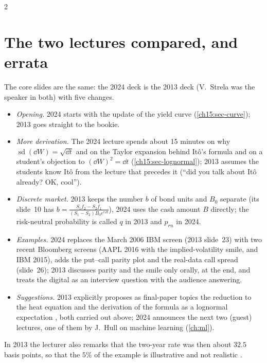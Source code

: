 \begin{paracol}{2}
\section{The two lectures compared, and errata}\label{ch15:sec-compare}
\begin{coursenote}[2013 versus 2024]
The core slides are the same: the 2024 deck is the 2013 deck (V.~Strela was the speaker in both) with five changes.
\begin{itemize}[nosep]
  \item \emph{Opening.} 2024 starts with the update of the yield curve (\cref{ch15:sec-curve}); 2013 goes straight to the bookie.
  \item \emph{More derivation.} The 2024 lecture spends about 15 minutes on why $\operatorname{sd}(\dd W)=\sqrt{\dd t}$ and on the Taylor expansion behind It\^o's formula and on a student's objection to $(\dd W)^2=\dd t$
        (\cref{ch15:sec-lognormal}); 2013 assumes the students know It\^o from the lecture that precedes it (``did you talk about It\^o already? OK, cool'').
  \item \emph{Discrete market.} 2013 keeps the number $b$ of bond units and $B_0$ separate (its slide~10 has $b=\frac{S_1f_2-S_2f_1}{(S_1-S_2)B_0e^{r\dd t}}$), 2024 uses the cash amount $B$ directly; the risk-neutral probability is called $q$ in 2013 and $p_{rn}$ in 2024.
  \item \emph{Examples.} 2024 replaces the March 2006 IBM screen (2013 slide~23) with two recent Bloomberg screens (AAPL 2016 with the implied-volatility smile, and IBM 2015), adds the put--call parity plot and the real-data
        call spread (slide~26); 2013 discusses parity and the smile only orally, at the end, and treats the digital as an interview question with the audience answering.
  \item \emph{Suggestions.} 2013 explicitly proposes as final-paper topics the reduction to the heat equation and the derivation of the formula as a lognormal expectation
        , both carried out above; 2024 announces the next two (guest) lectures, one of them by J.~Hull on machine learning (\cref{ch:ml}).
\end{itemize}
In 2013 the lecturer also remarks that the two-year rate was then about $32.5$ basis points, so that the $5\%$ of the example is illustrative and not realistic .
\end{coursenote}


\end{paracol}
